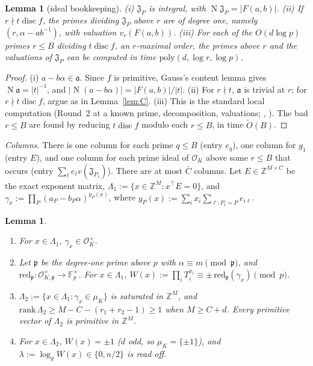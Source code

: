 \documentclass[11pt]{amsart}
\newtheorem{lemma}[theorem]{Lemma}
\theoremstyle{definition}
\newcommand{\Z}{\mathbb{Z}}
\newcommand{\F}{\mathbb{F}}
\newcommand{\cO}{\mathcal{O}}
\newcommand{\fp}{\mathfrak{p}}
\newcommand{\disc}{\operatorname{disc}}
\newcommand{\Norm}{\operatorname{N}}
\begin{document}
\begin{lemma}[ideal bookkeeping]\label{lem:XK0}
(i) $\mathfrak J_P$ is integral, with $\Norm\mathfrak J_P=|F(a,b)|$. (ii) If $r\nmid t\disc f$, the primes dividing $\mathfrak J_P$ above $r$ are of degree one,
namely $(r,\alpha-ab^{-1})$, with valuation $v_r(F(a,b))$. (iii) For each of the $O(d\log p)$ primes $r\le B$ dividing $t\disc f$, an $r$-maximal order,
the primes above $r$ and the valuations of $\mathfrak J_P$ can be computed in time $\mathrm{poly}(d,\log r,\log p)$.
\end{lemma}

\begin{proof}
(i) $a-b\alpha\in\mathfrak a$. Since $f$ is primitive, Gauss's content lemma gives $\Norm\mathfrak a=|t|^{-1}$, and $|\Norm(a-b\alpha)|=|F(a,b)|/|t|$.
(ii) For $r\nmid t$, $\mathfrak a$ is trivial at $r$; for $r\nmid t\disc f$, argue as in Lemma~\ref{lem:C}. (iii) This is the standard local
computation (Round~2 at a known prime, decomposition, valuations; \cite[\S\S4.8, 6.1--6.2]{cohen1993}, \cite{buchmannlenstra1994}). The bad $r\le B$
are found by reducing $t\disc f$ modulo each $r\le B$, in time $\tilde O(B)$.
\end{proof}

\emph{Columns.} There is one column for each prime $q\le B$ (entry $e_q$), one column for $g_1$ (entry $E$), and one column for each prime ideal of
$\cO_K$ above some $r\le B$ that occurs (entry $\sum_\ell e_\ell v(\mathfrak J_{P_\ell})$). There are at most $\bar C$ columns. Let $E\in\Z^{M\times C}$ be the exact
exponent matrix, $\Lambda_1:=\{x\in\Z^M:x^\top E=0\}$, and $\gamma_x:=\prod_P(a_P-b_P\alpha)^{y_P(x)}$, where $y_P(x):=\sum_ix_i\sum_{\ell:P_\ell=P}e_{i\ell}$.

\begin{lemma}\label{lem:XK123}
\begin{enumerate}[label=(\roman*)]
\item For $x\in\Lambda_1$, $\gamma_x\in\cO_K^\times$.
\item Let $\fp$ be the degree-one prime above $p$ with $\alpha\equiv m\pmod\fp$, and $\mathrm{red}_\fp:\cO_{K,\fp}^\times\to\F_p^\times$. For $x\in\Lambda_1$,
  $W(x):=\prod_iT_i^{x_i}\equiv\pm\,\mathrm{red}_\fp(\gamma_x)\pmod p$.
\item $\Lambda_2:=\{x\in\Lambda_1:\gamma_x\in\mu_K\}$ is saturated in $\Z^M$, and $\mathrm{rank}\,\Lambda_2\ge M-C-(r_1+r_2-1)\ge1$ when $M\ge C+d$. Every
  primitive vector of $\Lambda_2$ is primitive in $\Z^M$.
\item For $x\in\Lambda_2$, $W(x)=\pm1$ ($d$ odd, so $\mu_K=\{\pm1\}$), and $\lambda:=\log_gW(x)\in\{0,n/2\}$ is read off.
\end{enumerate}
\end{lemma}
\end{document}
